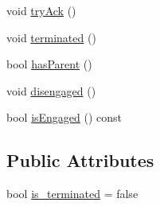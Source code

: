 \begin{DoxyCompactItemize}
\item 
void \hyperlink{structvt_1_1term_1_1ds_1_1_term_d_s_ad5693df663610dc8003d37c5c505b9f4}{try\+Ack} ()
\item 
void \hyperlink{structvt_1_1term_1_1ds_1_1_term_d_s_acf4896eceb679d2ee46f5cc0ff1420e3}{terminated} ()
\item 
bool \hyperlink{structvt_1_1term_1_1ds_1_1_term_d_s_a5d112306bb319f8d5f542a104ccb87a6}{has\+Parent} ()
\item 
void \hyperlink{structvt_1_1term_1_1ds_1_1_term_d_s_a7f77705496eed386505e5bd266fc9800}{disengaged} ()
\item 
bool \hyperlink{structvt_1_1term_1_1ds_1_1_term_d_s_a5587da947484c81472ff0a4563a2efb4}{is\+Engaged} () const
\end{DoxyCompactItemize}
\subsection*{Public Attributes}
\begin{DoxyCompactItemize}
\item 
bool \hyperlink{structvt_1_1term_1_1ds_1_1_term_d_s_af53bdb81804df4d07dc7fd647329a89a}{is\+\_\+terminated} = false
\end{DoxyCompactItemize}
